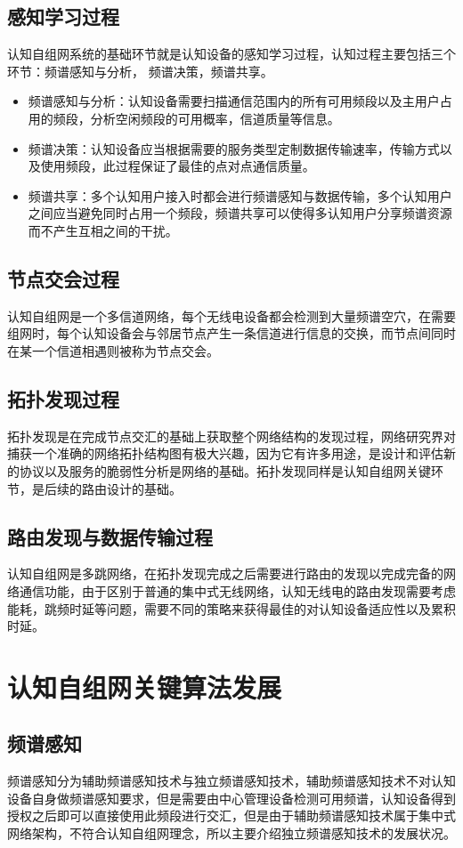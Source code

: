 \documentclass[a4paper,AutoFakeBold,oneside,12pt]{book}
\begin{document}
\subsection{感知学习过程}
  认知自组网系统的基础环节就是认知设备的感知学习过程，认知过程主要包括三个环节：频谱感知与分析， 频谱决策，频谱共享。
\begin{itemize}%
  \item 频谱感知与分析：认知设备需要扫描通信范围内的所有可用频段以及主用户占用的频段，分析空闲频段的可用概率，信道质量等信息。

  \item 频谱决策：认知设备应当根据需要的服务类型定制数据传输速率，传输方式以及使用频段，此过程保证了最佳的点对点通信质量。

  \item 频谱共享：多个认知用户接入时都会进行频谱感知与数据传输，多个认知用户之间应当避免同时占用一个频段，频谱共享可以使得多认知用户分享频谱资源而不产生互相之间的干扰。
 \end{itemize}
\subsection{节点交会过程}
  认知自组网是一个多信道网络，每个无线电设备都会检测到大量频谱空穴，在需要组网时，每个认知设备会与邻居节点产生一条信道进行信息的交换，而节点间同时在某一个信道相遇则被称为节点交会。
\subsection{拓扑发现过程}
  拓扑发现是在完成节点交汇的基础上获取整个网络结构的发现过程，网络研究界对捕获一个准确的网络拓扑结构图有极大兴趣，因为它有许多用途，是设计和评估新的协议以及服务的脆弱性分析是网络的基础。拓扑发现同样是认知自组网关键环节，是后续的路由设计的基础。
\subsection{路由发现与数据传输过程}
  认知自组网是多跳网络，在拓扑发现完成之后需要进行路由的发现以完成完备的网络通信功能，由于区别于普通的集中式无线网络，认知无线电的路由发现需要考虑能耗，跳频时延等问题，需要不同的策略来获得最佳的对认知设备适应性以及累积时延。
\section{认知自组网关键算法发展}
  
\subsection{频谱感知}
  频谱感知分为辅助频谱感知技术与独立频谱感知技术，辅助频谱感知技术不对认知设备自身做频谱感知要求，但是需要由中心管理设备检测可用频谱，认知设备得到授权之后即可以直接使用此频段进行交汇，但是由于辅助频谱感知技术属于集中式网络架构，不符合认知自组网理念，所以主要介绍独立频谱感知技术的发展状况。
\end{document}
